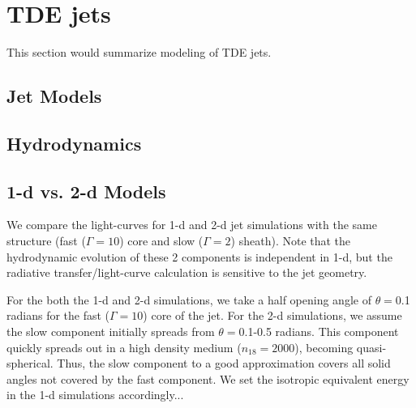 \documentclass[usenatbib,fleqn]{mnras}
\newcommand{\Mbh}[1][]{M_{\bullet#1}}
\begin{document}


\section{TDE jets}
\label{sec:jet}
This section would summarize modeling of TDE jets.

\subsection{Jet Models}

\subsection{Hydrodynamics}

\subsection{1-d vs. 2-d Models}
\label{sec:2d}
We compare the light-curves for 1-d and 2-d jet simulations with the
same structure (fast ($\Gamma=10$) core and slow ($\Gamma=2$)
sheath). Note that the hydrodynamic evolution of these 2 components is
independent in 1-d, but the radiative transfer/light-curve calculation
is sensitive to the jet geometry.

For the both the 1-d and 2-d simulations, we take a half opening angle
of $\theta=$0.1 radians for the fast ($\Gamma=10$) core of the
jet. For the 2-d simulations, we assume the slow component initially
spreads from $\theta=$0.1-0.5 radians. This component quickly spreads
out in a high density medium ($n_{18}=2000$), becoming
quasi-spherical. Thus, the slow component to a good approximation
covers all solid angles not covered by the fast component. We set the
isotropic equivalent energy in the 1-d simulations accordingly...
\end{document}
